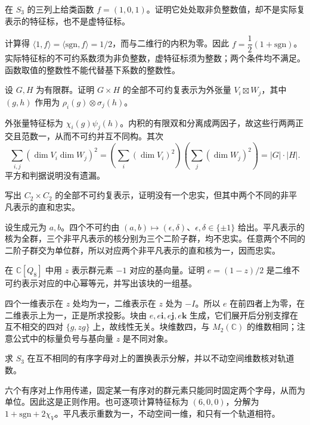 \begin{exercise}\label{b5:ex:02-integral-values-not-character}
	在 \(S_3\) 的三列上给类函数 \(f=(1,0,1)\)。证明它处处取非负整数值，却不是实际复表示的特征标，也不是虚特征标。
\end{exercise}
\begin{solution}
	计算得 \(\langle1,f\rangle=\langle\mathrm{sgn},f\rangle=1/2\)，而与二维行的内积为零。因此 \(f=\dfrac12(1+\mathrm{sgn})\)。实际特征标的不可约系数须为非负整数，虚特征标须为整数；两个条件均不满足。函数取值的整数性不能代替基下系数的整数性。
\end{solution}

\begin{exercise}\label{b5:ex:02-product-groups}
	设 \(G,H\) 为有限群。证明 \(G\times H\) 的全部不可约复表示为外张量 \(V_i\boxtimes W_j\)，其中 \((g,h)\) 作用为 \(\rho_i(g)\otimes\sigma_j(h)\)。
\end{exercise}
\begin{solution}
	外张量特征标为 \(\chi_i(g)\psi_j(h)\)。内积的有限双和分离成两因子，故这些行两两正交且范数一，从而不可约并互不同构。其次
	\[
		\sum_{i,j}(\dim V_i\dim W_j)^2 =\left(\sum_i(\dim V_i)^2\right) \left(\sum_j(\dim W_j)^2\right)=|G|\cdot|H|.
	\]
	平方和判据说明没有遗漏。
\end{solution}

\begin{exercise}\label{b5:ex:02-nonfaithful-irreds}
	写出 \(C_2\times C_2\) 的全部不可约复表示，证明没有一个忠实，但其中两个不同的非平凡表示的直和忠实。
\end{exercise}
\begin{solution}
	设生成元为 \(a,b\)。四个不可约由 \((a,b)\mapsto(\epsilon,\delta)\)、\(\epsilon,\delta\in\{\pm1\}\) 给出。平凡表示的核为全群，三个非平凡表示的核分别为三个二阶子群，均不忠实。任意两个不同的二阶子群交为单位群，所以对应两个非平凡表示的直和核为一，因而忠实。
\end{solution}

\begin{exercise}\label{b5:ex:02-q8-two-dimensional-block}
	在 \(\mathbb C[Q_8]\) 中用 \(z\) 表示群元素 \(-1\) 对应的基向量。证明 \(e=(1-z)/2\) 是二维不可约表示对应的中心幂等元，并写出该块的一组基。
\end{exercise}
\begin{solution}
	四个一维表示在 \(z\) 处均为一，二维表示在 \(z\) 处为 \(-I\)。所以 \(e\) 在前四者上为零，在二维表示上为一，正是所求投影。块由 \(e,e\mathbf i,e\mathbf j,e\mathbf k\) 生成，它们展开后分别支撑在互不相交的四对 \(\{g,zg\}\) 上，故线性无关。块维数四，与 \(M_2(\mathbb C)\) 的维数相同；注意公式中的标量负号与基向量 \(z\) 是不同对象。
\end{solution}

\begin{exercise}\label{b5:ex:02-ordered-pairs-s3}
	求 \(S_3\) 在互不相同的有序字母对上的置换表示分解，并以不动空间维数核对轨道数。
\end{exercise}
\begin{solution}
	六个有序对上作用传递，固定某一有序对的群元素只能同时固定两个字母，从而为单位。因此这是正则作用。也可逐项计算特征标为 \((6,0,0)\)，分解为 \(1+\mathrm{sgn}+2\chi_V\)。平凡表示重数为一，不动空间一维，和只有一个轨道相符。
\end{solution}
